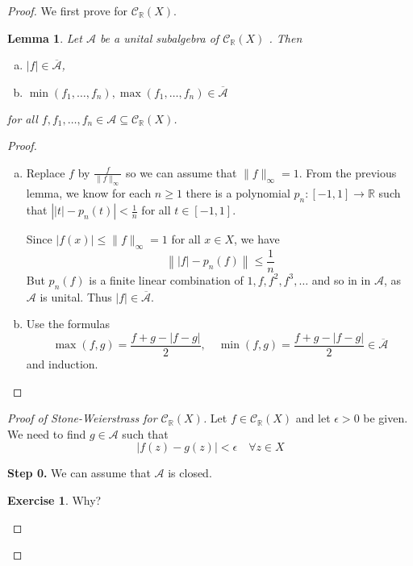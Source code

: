 \documentclass[10pt, oneside, reqno]{amsbook}
\theoremstyle{plain}%
\newtheorem{lem}[thm]{Lemma}
\theoremstyle{definition}
\newtheorem{exer}[thm]{Exercise}
\theoremstyle{remark}
\newcommand{\R}{\mathbb{R}}
\begin{document}
\begin{proof}
    We first prove for $\mathcal{C}_\R(X)$. 
    
    \begin{lem}
        Let $\mathcal{A}$ be a unital subalgebra of $\mathcal{C}_\R(X)$ . Then \begin{enumerate}[(a)]
            \item $|f| \in \overline{\mathcal{A}}$,
            \item $\min(f_1, \dots, f_n), \max(f_1, \dots, f_n) \in \overline{\mathcal{A}}$ 
        \end{enumerate} for all $f, f_1, \dots, f_n \in \mathcal{A} \subseteq \mathcal{C}_\R(X)$. 
    \end{lem}
    \begin{proof}
        \begin{enumerate}[(a)]
            \item Replace $f$ by $\frac{f}{\| f \|_\infty}$ so we can assume that $\|f \|_\infty = 1$.  From the previous lemma, we know for each $n \geq 1$ there is a polynomial $p_n: [-1,1] \rightarrow \R$  such that $\left| |t| - p_n(t) \right| < \frac{1}{n}$ for all $t \in [-1,1]$. 
            
            Since $|f(x)| \leq \|f \|_\infty = 1$ for all $x \in X$, we have \[
                \left\| |f| - p_n(f) \right\| \leq \frac{1}{n}
            \] But $p_n(f)$ is a finite linear combination of $1, f, f^2, f^3, \dots$ and so in in $\mathcal{A}$, as $\mathcal{A}$ is unital.  Thus $|f| \in \overline{\mathcal{A}}$.  
            \item Use the formulas \[
                \max(f,g) = \frac{f+g - |f-g|}{2}, \quad \min(f,g) = \frac{f + g - |f-g|}{2} \in \overline{\mathcal{A}}
            \] and induction.  
        \end{enumerate}
    \end{proof}
    
    \begin{proof}[Proof of Stone-Weierstrass for $\mathcal{C}_\R(X)$]
        Let $f \in \mathcal{C}_\R(X)$ and let $\epsilon > 0$ be given.  We need to find $g \in \mathcal{A}$ such that \[
            |f(z) - g(z) | < \epsilon \quad \forall z \in X 
        \]
        
        \textbf{Step 0.}  We can assume that $\mathcal{A}$ is closed.  
        \begin{exer}
            Why?
        \end{exer} 
        

\end{proof}
\end{proof}
\end{document}

